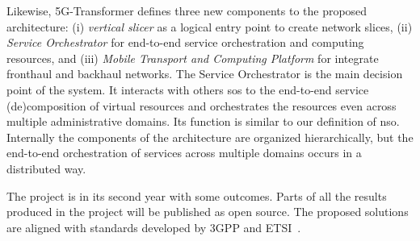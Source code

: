 Likewise, 5G-Transformer defines three new components to the proposed architecture: (i) \textit{vertical slicer} as a logical entry point to create network slices, (ii) \textit{Service Orchestrator} for end-to-end service orchestration and computing resources, and (iii) \textit{Mobile Transport and Computing Platform} for integrate fronthaul and backhaul networks. The Service Orchestrator is the main decision point of the system. It interacts with others \glspl{so} to the end-to-end service (de)composition of virtual resources and orchestrates the resources even across multiple administrative domains. Its function is similar to our definition of \gls{nso}. Internally the components of the architecture are organized hierarchically, but the end-to-end orchestration of services across multiple domains occurs in a distributed way.

The project is in its second year with some outcomes. Parts of all the results produced in the project will be published as open source. The proposed solutions are aligned with standards developed by 3GPP and ETSI~\cite{H20205G-TRANSFORMERProject2018}.








